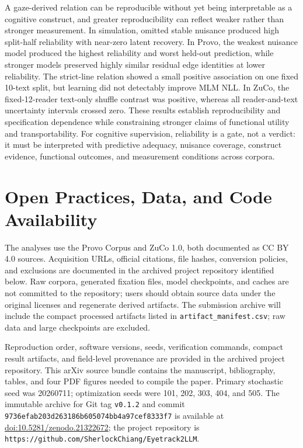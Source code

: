 \documentclass[11pt]{article}
\begin{document}
A gaze-derived relation can be reproducible without yet being interpretable as a cognitive construct, and greater reproducibility can reflect weaker rather than stronger measurement. In simulation, omitted stable nuisance produced high split-half reliability with near-zero latent recovery. In Provo, the weakest nuisance model produced the highest reliability and worst held-out prediction, while stronger models preserved highly similar residual edge identities at lower reliability. The strict-line relation showed a small positive association on one fixed 10-text split, but learning did not detectably improve MLM NLL. In ZuCo, the fixed-12-reader text-only shuffle contrast was positive, whereas all reader-and-text uncertainty intervals crossed zero. These results establish reproducibility and specification dependence while constraining stronger claims of functional utility and transportability. For cognitive supervision, reliability is a gate, not a verdict: it must be interpreted with predictive adequacy, nuisance coverage, construct evidence, functional outcomes, and measurement conditions across corpora.

\section{Open Practices, Data, and Code Availability}

The analyses use the Provo Corpus and ZuCo 1.0, both documented as CC BY 4.0 sources. Acquisition URLs, official citations, file hashes, conversion policies, and exclusions are documented in the archived project repository identified below. Raw corpora, generated fixation files, model checkpoints, and caches are not committed to the repository; users should obtain source data under the original licenses and regenerate derived artifacts. The submission archive will include the compact processed artifacts listed in \texttt{artifact\_manifest.csv}; raw data and large checkpoints are excluded.

Reproduction order, software versions, seeds, verification commands, compact result artifacts, and field-level provenance are provided in the archived project repository. This arXiv source bundle contains the manuscript, bibliography, tables, and four PDF figures needed to compile the paper. Primary stochastic seed was 20260711; optimization seeds were 101, 202, 303, 404, and 505. The immutable archive for Git tag \texttt{v0.1.2} and commit \texttt{9736efab203d263186b605074bb4a97cef8333f7} is available at \href{https://doi.org/10.5281/zenodo.21322672}{doi:10.5281/zenodo.21322672}; the project repository is \texttt{https://github.com/SherlockChiang/Eyetrack2LLM}.
\end{document}
